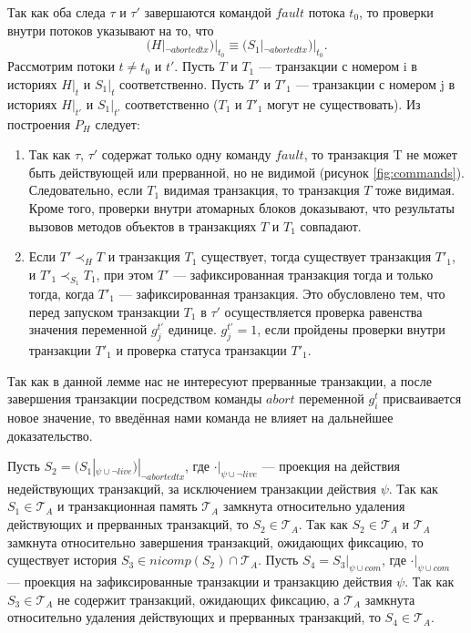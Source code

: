 \begin{myproof}
Так как оба следа $\tau$ и $\tau'$ завершаются командой $fault$ потока $t_0$, то проверки внутри потоков указывают на то, что \begin{equation} \label{eq:hist_fault}
(H|_{\neg abortedtx})|_{t_0} \equiv ({S_1}|_{\neg abortedtx})|_{t_0}. 
\end{equation}
Рассмотрим потоки $t \neq t_0$ и $t'$. Пусть $T$ и $T_1$ --- транзакции с номером i в историях $H|_t$ и ${S_1}|_t$ соответственно. Пусть $T'$ и $T'_1$ --- транзакции с номером j в историях $H|_{t'}$ и ${S_1}|_{t'}$ соответственно ($T_1$ и $T'_1$ могут не существовать). Из построения $P_H$ следует:
\begin{enumerate}
\item Так как $\tau$, $\tau'$ содержат только одну команду $fault$, то транзакция T не может быть действующей или прерванной, но не видимой (рисунок \ref{fig:commands}). Следовательно, если $T_1$ видимая транзакция, то транзакция $T$ тоже видимая. Кроме того, проверки внутри атомарных блоков доказывают, что результаты вызовов методов объектов в транзакциях $T$ и $T_1$ совпадают.  
\item Если $T' \prec_H T$ и транзакция $T_1$ существует, тогда существует транзакция $T'_1$, и $T'_1 \prec_{S_1} T_1$, при этом $T'$ --- зафиксированная транзакция тогда и только тогда, когда $T'_1$ --- зафиксированная транзакция. Это обусловлено тем, что перед запуском транзакции $T_1$ в $\tau'$ осуществляется проверка равенства значения переменной $g^{t'}_j$ единице. $g^{t'}_j = 1$, если пройдены проверки внутри транзакции $T'_1$ и проверка статуса транзакции $T'_1$.   
\end{enumerate}

Так как в данной лемме нас не интересуют прерванные транзакции, а после завершения транзакции посредством команды $abort$ переменной $g^t_i$ присваивается новое значение, то введённая нами команда не влияет на дальнейшее доказательство. 

Пусть $S_2 = (S_1|_{\psi\cup{\neg live}})|_{\neg abortedtx}$, где $\cdot|_{\psi \cup {\neg live}}$ --- проекция на действия недействующих транзакций, за исключением транзакции действия $\psi$. Так как $S_1 \in \mathcal{T}_A$ и транзакционная память $\mathcal{T}_A$ замкнута относительно удаления действующих и прерванных транзакций, то $S_2 \in \mathcal{T}_A$. Так как $S_2 \in \mathcal{T}_A$ и $\mathcal{T}_A$ замкнута относительно завершения транзакций, ожидающих фиксацию, то существует история $S_3 \in nicomp(S_2) \cap \mathcal{T}_A$. Пусть $S_4 = S_3|_{\psi \cup com}$, где $\cdot|_{\psi \cup com}$ --- проекция на зафиксированные транзакции и транзакцию действия $\psi$. Так как $S_3 \in \mathcal{T}_A$ не содержит транзакций, ожидающих фиксацию, а $\mathcal{T}_A$ замкнута относительно удаления действующих и прерванных транзакций, то $S_4 \in \mathcal{T}_A$.


\end{myproof}
